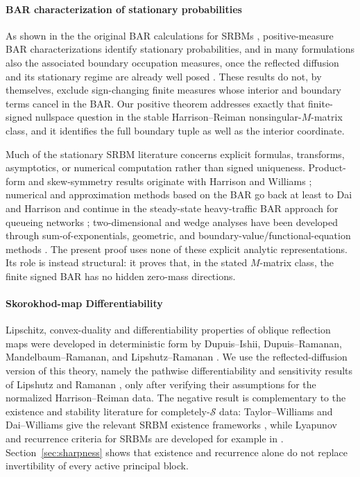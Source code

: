 \documentclass[aihp]{imsart}
\numberwithin{equation}{section}
\theoremstyle{plain}
\theoremstyle{definition}
\newcommand{\1}{\mathbf 1}
\begin{document}
\paragraph{BAR characterization of stationary probabilities} As shown in the the original BAR calculations for SRBMs \cite{harrison1987multidimensional,harrison1987brownian},  positive-measure BAR characterizations identify stationary probabilities, and in many formulations also the associated boundary occupation measures, once the reflected diffusion and its stationary regime are already well posed  \cite{DaiHarrison1991,DaiHarrison1992,KangRamanan2014}.   These results do not, by themselves, exclude sign-changing finite measures whose interior and boundary terms cancel in the BAR.  Our positive theorem addresses exactly that finite-signed nullspace question in the stable Harrison--Reiman nonsingular-$M$-matrix class, and it identifies the full boundary tuple as well as the interior coordinate.

Much of the stationary SRBM literature concerns explicit formulas, transforms, asymptotics, or numerical computation rather than signed uniqueness.  Product-form and skew-symmetry results originate with Harrison and Williams \cite{harrison1987multidimensional}; numerical and approximation methods based on the BAR go back at least to Dai and Harrison \cite{DaiHarrison1991,DaiHarrison1992} and continue in the steady-state heavy-traffic BAR approach for queueing networks \cite{BravermanDaiMiyazawa2017,BravermanDaiMiyazawa2025}; two-dimensional and wedge analyses have been developed through sum-of-exponentials, geometric, and boundary-value/functional-equation methods \cite{DiekerMoriarty2009,DaiMiyazawa2011,DaiMiyazawa2013,FranceschiRaschel2017,FranceschiRaschel2019}.  The present proof uses none of these explicit analytic representations.  Its role is instead structural: it proves that, in the stated $M$-matrix class, the finite signed BAR has no hidden zero-mass directions.

\paragraph{Skorokhod-map Differentiability} Lipschitz, convex-duality and differentiability properties of oblique reflection maps were developed in deterministic form by Dupuis--Ishii, Dupuis--Ramanan, Mandelbaum--Ramanan, and Lipshutz--Ramanan \cite{DupuisIshii1991,DupuisRamanan1999I,DupuisRamanan1999II,MandelbaumRamanan2010,LipshutzRamanan2018}.  We use the reflected-diffusion version of this theory, namely the pathwise differentiability and sensitivity results of Lipshutz and Ramanan \cite{LipshutzRamanan2019,LipshutzRamanan2021}, only after verifying their assumptions for the normalized Harrison--Reiman data.  The negative result is complementary to the existence and stability literature for completely-$\mathcal{S}$ data: Taylor--Williams and Dai--Williams give the relevant SRBM existence frameworks \cite{TaylorWilliams1993,DaiWilliams1995}, while Lyapunov and recurrence criteria for SRBMs are developed for example in \cite{DupuisWilliams1994,BramsonDaiHarrison2010,Sarantsev2017}.  Section~\ref{sec:sharpness} shows that existence and recurrence alone do not replace invertibility of every active principal block.
\end{document}
